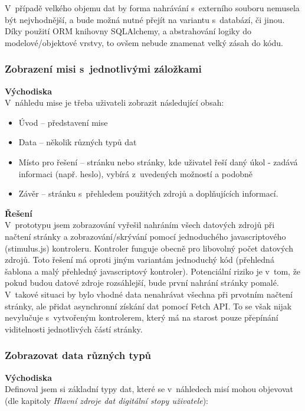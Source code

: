 	V~případě velkého objemu dat by forma nahrávání s~externího souboru nemusela být nejvhodnější, a bude možná nutné přejít na variantu s~databází, či jinou. Díky použití ORM knihovny SQLAlchemy, a abstrahování logiky do modelové/objektové vrstvy, to ovšem nebude znamenat velký zásah do kódu. 

\subsubsection*{Zobrazení misi s~jednotlivými záložkami}
	\textbf{Východiska}\\
	V~náhledu mise je třeba uživateli zobrazit následující obsah:
	
	\begin{itemize}
		\item Úvod -- představení mise
		\item Data -- několik různých typů dat
		\item Místo pro řešení -- stránku nebo stránky, kde uživatel řeší daný úkol - zadává informaci (např. heslo), vybírá z~uvedených možností a podobně
		\item Závěr -- stránku s~přehledem použitých zdrojů a doplňujících informací. 
	\end{itemize}	

	\textbf{Řešení}\\
	V~prototypu jsem zobrazování vyřešil nahráním všech datových zdrojů při načtení stránky a zobrazování/skrývání pomocí jednoduchého javascriptového (stimulus.js) kontroleru. Kontroler funguje obecně pro libovolný počet datových zdrojů.
	Toto řešení má oproti jiným variantám jednoduchý kód (přehledná šablona a malý přehledný javascriptový kontroler).
	Potenciální riziko je v~tom, že pokud budou datové zdroje rozsáhlejší, bude první nahrání stránky pomalé. V~takové situaci by bylo vhodné data nenahrávat všechna při prvotním načtení stránky, ale přidat asynchronní získání dat pomocí Fetch API. To se však nijak nevylučuje s~vytvořeným kontrolerem, který má na starost pouze přepínání viditelnosti jednotlivých částí stránky.

\subsubsection*{Zobrazovat data různých typů}
	\textbf{Východiska}\\
	Definoval jsem si základní typy dat, které se v~náhledech misí mohou objevovat (dle kapitoly \textit{Hlavní zdroje dat digitální stopy uživatele}): 

